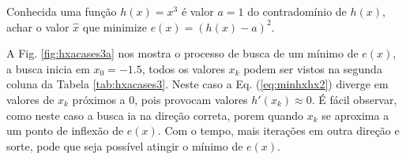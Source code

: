 \begin{example}\label{ex:minhxhx3}
Conhecida uma função $h(x)=x^3$ é valor $a=1$ do contradomínio de $h(x)$,
achar o valor $\hat{x}$ que minimize $e(x)=(h(x)-a)^2$.
\end{example}
\begin{SolutionT}\label{sol:minhxhx3}
 A Fig. \ref{fig:hxacases3a} nos mostra o processo de busca de um mínimo
 de $e(x)$, a busca inicia em $x_0=-1.5$,
 todos os valores $x_{k}$ podem ser vistos na segunda coluna da
Tabela \ref{tab:hxacases3}. Neste caso a Eq. (\ref{eq:minhxhx2}) diverge em 
valores de $x_{k}$ próximos a $0$, pois provocam valores  $h'(x_{k})\approx 0$.
É fácil observar, como neste caso a busca ia na direção correta,
porem quando $x_{k}$ se aproxima a um ponto de inflexão de $e(x)$.
Com o tempo, mais iterações em outra direção e sorte, 
pode que seja possível atingir o mínimo de $e(x)$.
\end{SolutionT}

